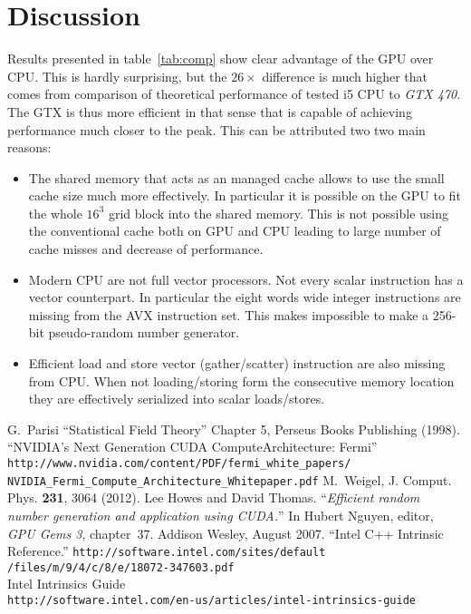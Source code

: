 \documentclass[a4paper]{llncs}
\begin{document}
\section{Discussion}

Results presented in table~\ref{tab:comp} show clear advantage of the
GPU over CPU. This is hardly surprising, but the $26\times$ difference
is much higher that comes from comparison of theoretical performance of
tested i5 CPU to \emph{GTX 470}. The GTX is thus more efficient in
that sense that is capable of achieving performance much closer to the
peak. This can be attributed two two main reasons:
\begin{itemize}
\item The shared memory that acts as an managed cache allows to use
  the small cache size much more effectively. In particular it is
  possible on the GPU to fit the whole $16^3$ grid block into the
  shared memory. This is not possible using the conventional cache
  both on GPU and CPU leading to large number of cache misses and
  decrease of performance.
\item Modern CPU are not full vector processors. Not every scalar
  instruction has a vector counterpart. In particular the eight words
  wide integer instructions are missing from the AVX instruction set.
  This makes impossible to make a 256-bit pseudo-random number
  generator.
\item Efficient load and store vector (gather/scatter) instruction are
  also missing from CPU.  When not loading/storing form the
  consecutive memory location they are effectively serialized into
  scalar loads/stores.
\end{itemize}

\begin{thebibliography}{9}
 G.~Parisi ``Statistical Field Theory'' Chapter 5, Perseus Books Publishing (1998).
``NVIDIA's Next Generation CUDA ComputeArchitecture: Fermi'' \\
\verb!http://www.nvidia.com/content/PDF/fermi_white_papers/!\\
\verb!NVIDIA_Fermi_Compute_Architecture_Whitepaper.pdf!
 M.~Weigel, J. Comput. Phys. \textbf{231}, 3064 (2012).
Lee Howes and David Thomas.
``{\em Efficient random number generation and application using {CUDA}.}''
In Hubert Nguyen, editor, {\em GPU Gems 3}, chapter~37. Addison
  Wesley, August 2007.
 ``Intel C++ Intrinsic Reference.'' \verb!http://software.intel.com/sites/default!\\\verb!/files/m/9/4/c/8/e/18072-347603.pdf! \\
Intel Intrinsics Guide\\ \verb!http://software.intel.com/en-us/articles/intel-intrinsics-guide!

\end{thebibliography}
\end{document}
